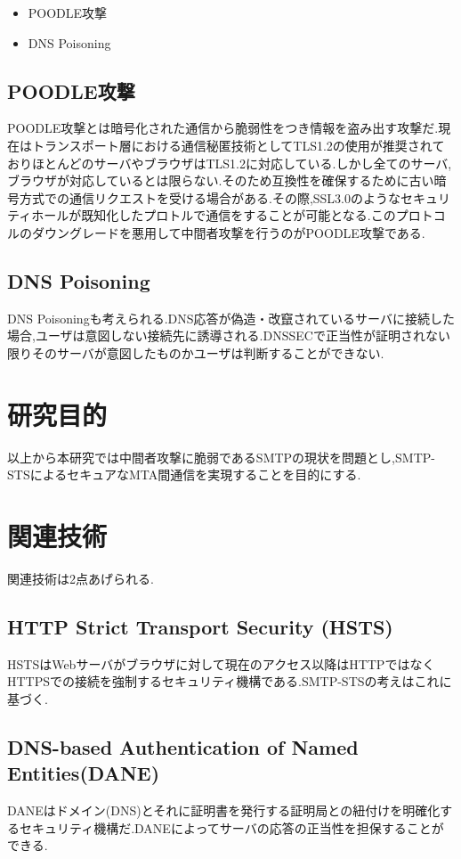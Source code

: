 \documentclass[a4j,10pt]{jsarticle}
\begin{document}
\begin{itemize}
\item POODLE攻撃 
\item DNS Poisoning
\end{itemize}

\subsection{POODLE攻撃}
POODLE攻撃とは暗号化された通信から脆弱性をつき情報を盗み出す攻撃だ.現在はトランスポート層における通信秘匿技術としてTLS1.2の使用が推奨されておりほとんどのサーバやブラウザはTLS1.2に対応している.しかし全てのサーバ,ブラウザが対応しているとは限らない.そのため互換性を確保するために古い暗号方式での通信リクエストを受ける場合がある.その際,SSL3.0のようなセキュリティホールが既知化したプロトルで通信をすることが可能となる.このプロトコルのダウングレードを悪用して中間者攻撃を行うのがPOODLE攻撃である.

\subsection{DNS Poisoning}
DNS Poisoningも考えられる.DNS応答が偽造・改竄されているサーバに接続した場合,ユーザは意図しない接続先に誘導される.DNSSECで正当性が証明されない限りそのサーバが意図したものかユーザは判断することができない.

\section{研究目的}

以上から本研究では中間者攻撃に脆弱であるSMTPの現状を問題とし,SMTP-STSによるセキュアなMTA間通信を実現することを目的にする.


\section{関連技術}

関連技術は2点あげられる.

\subsection{HTTP Strict Transport Security (HSTS)}
HSTSはWebサーバがブラウザに対して現在のアクセス以降はHTTPではなくHTTPSでの接続を強制するセキュリティ機構である.SMTP-STSの考えはこれに基づく.

\subsection{DNS-based Authentication of Named Entities(DANE)}
DANEはドメイン(DNS)とそれに証明書を発行する証明局との紐付けを明確化するセキュリティ機構だ.DANEによってサーバの応答の正当性を担保することができる.
\end{document}
